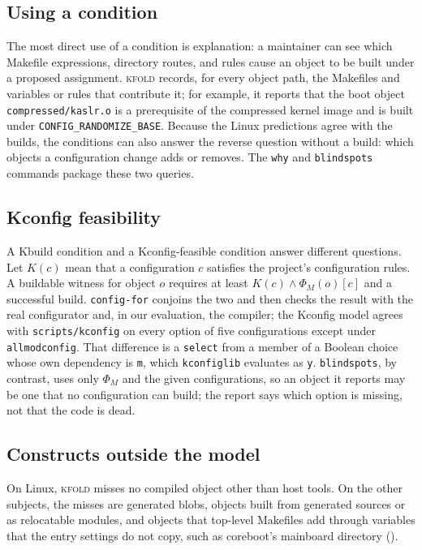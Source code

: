 \documentclass[acmsmall,screen,review]{acmart}
\newcommand{\tool}{\textsc{kfold}\xspace}
\begin{document}
\subsection{Using a condition}
The most direct use of a condition is explanation: a maintainer can see which Makefile expressions, directory routes, and rules cause an object to be built under a proposed assignment. \tool records, for every object path, the Makefiles and variables or rules that contribute it; for example, it reports that the boot object \texttt{compressed/kaslr.o} is a prerequisite of the compressed kernel image and is built under \texttt{CONFIG\_RANDOMIZE\_BASE}. Because the Linux predictions agree with the builds, the conditions can also answer the reverse question without a build: which objects a configuration change adds or removes. The \texttt{why} and \texttt{blindspots} commands package these two queries.

\subsection{Kconfig feasibility}
A Kbuild condition and a Kconfig-feasible condition answer different questions. Let $K(c)$ mean that a configuration $c$ satisfies the project's configuration rules. A buildable witness for object $o$ requires at least $K(c)\land\Phi_M(o)[c]$ and a successful build. \texttt{config-for} conjoins the two and then checks the result with the real configurator and, in our evaluation, the compiler; the Kconfig model agrees with \texttt{scripts/kconfig} on every option of five configurations except \NKconfigMismatches under \texttt{allmodconfig}. That difference is a \texttt{select} from a member of a Boolean choice whose own dependency is \texttt{m}, which \texttt{kconfiglib} evaluates as \texttt{y}. \texttt{blindspots}, by contrast, uses only $\Phi_M$ and the given configurations, so an object it reports may be one that no configuration can build; the report says which option is missing, not that the code is dead.

\subsection{Constructs outside the model}
\label{sec:discussion:constructs}
On Linux, \tool misses no compiled object other than host tools. On the other subjects, the misses are generated blobs, objects built from generated sources or as relocatable modules, and objects that top-level Makefiles add through variables that the entry settings do not copy, such as coreboot's mainboard directory ().
\end{document}
